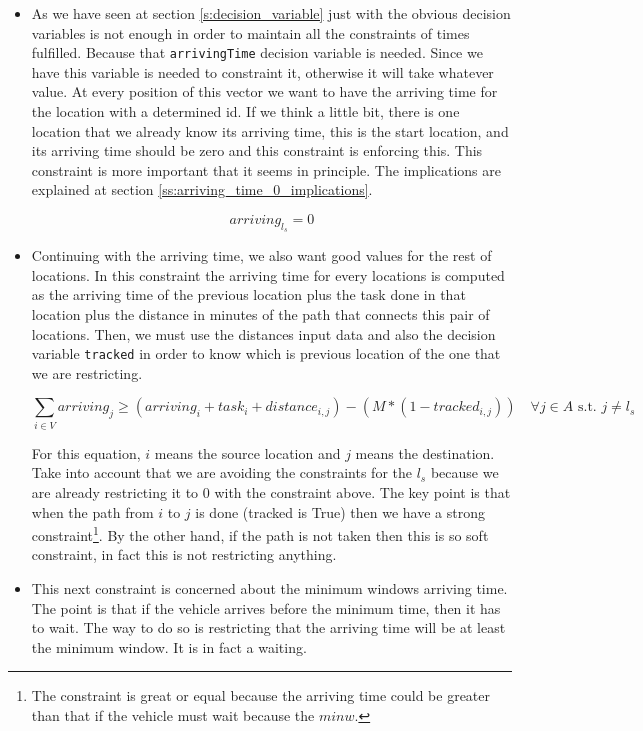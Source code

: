 \documentclass[]{report}
\begin{document}
\begin{itemize}
	\item As we have seen at section \ref{s:decision_variable} just with the obvious decision variables is not enough in order to maintain all the constraints of times fulfilled. Because that {\tt arrivingTime} decision variable is needed. Since we have this variable is needed to constraint it, otherwise it will take whatever value. At every position of this vector we want to have the arriving time for the location with a determined id. If we think a little bit, there is one location that we already know its arriving time, this is the start location, and its arriving time should be zero and this constraint is enforcing this. This constraint is more important that it seems in principle. The implications are explained at section \ref{ss:arriving_time_0_implications}.
	
	$$ arriving_{l_{s}} = 0 $$

	\item Continuing with the arriving time, we also want good values for the rest of locations. In this constraint the arriving time for every locations is computed as the arriving time of the previous location plus the task done in that location plus the distance in minutes of the path that connects this pair of locations. Then, we must use the distances input data and also the decision variable {\tt tracked} in order to know which is previous location of the one that we are restricting.
	
	$$ \sum\limits_{i \in V} arriving_{j} \geq (arriving_i + task_i + distance_{i, j}) - (M*(1-tracked_{i, j})) \quad \forall j \in A \text{ s.t. } j \neq l_{s}$$
		
	For this equation, $i$ means the source location and $j$ means the destination. Take into account that we are avoiding the constraints for the $l_{s}$ because we are already restricting it to $0$ with the constraint above.
	The key point is that when the path from $i$ to $j$ is done (tracked is True) then we have a strong constraint\footnote{The constraint is great or equal because the arriving time could be greater than that if the vehicle must wait because the $minw$.}. By the other hand, if the path is not taken then this is so soft constraint, in fact this is not restricting anything.
	
	\item This next constraint is concerned about the minimum windows arriving time. The point is that if the vehicle arrives before the minimum time, then it has to wait. The way to do so is restricting that the arriving time will be at least the minimum window. It is in fact a waiting.
	

\end{itemize}
\end{document}
